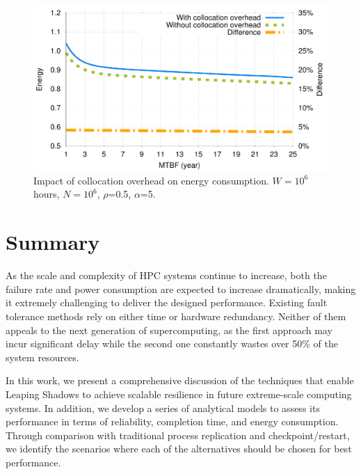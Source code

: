 
\begin{figure}[!h]
	\begin{center}
		\includegraphics[width=0.7\columnwidth]{Figures/collocation.pdf}
	\end{center}
	\caption{Impact of collocation overhead on energy consumption. $W=10^6$ hours, $N=10^6$, $\rho$=0.5, $\alpha$=5.}
	\label{fig:comp_vary_fail_speed}
\end{figure}






\section{Summary}

As the scale and complexity of HPC systems continue to increase, both the failure rate and power consumption are expected to increase dramatically, making it extremely challenging to deliver the designed performance. Existing fault tolerance methods rely on either time or hardware redundancy. Neither of them appeals to the next generation of supercomputing, as the first approach may incur significant delay while the second one constantly wastes over 50\% of the system resources.

In this work, we present a comprehensive discussion of the techniques that enable Leaping Shadows to achieve scalable resilience in future extreme-scale computing systems. In addition, we develop a series of analytical models to assess its performance in terms of reliability, completion time, and energy consumption. 
Through comparison with traditional process replication and checkpoint/restart, we identify the scenarios where each of the alternatives should be chosen for best performance.










